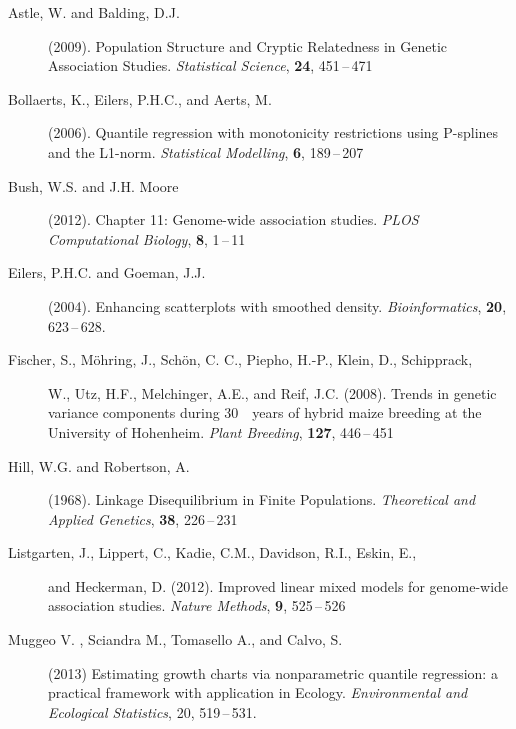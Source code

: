 \documentclass[twoside]{report}
\begin{document}




\begin{description}
\item[Astle, W. and Balding, D.J.] (2009).
		Population Structure and Cryptic Relatedness in Genetic Association Studies.
		{\it Statistical Science}, {\bf 24}, 451\,--\,471
\item[Bollaerts, K., Eilers, P.H.C., and Aerts, M.] (2006). 
	Quantile regression with monotonicity restrictions using P-splines and the L1-norm. 
	{\it Statistical Modelling}, {\bf 6}, 189\,--\,207 
\item[Bush, W.S. and J.H. Moore] (2012).
		Chapter 11: Genome-wide association studies.
		{\it PLOS Computational Biology}, {\bf 8}, 1\,--\,11
\item[Eilers, P.H.C. and Goeman, J.J.] (2004).
	Enhancing scatterplots with \newline smoothed density.
	{\it Bioinformatics}, {\bf 20}, 623\,--\,628.
\item[Fischer, S., M\"{o}hring, J., Sch\"{o}n, C. C., Piepho, H.-P., Klein, D., Schipprack,] W., {Utz, H.F., Melchinger, A.E., and Reif, J.C.} (2008).
		Trends in genetic variance components during 30 years of hybrid maize breeding at the University of Hohenheim.
		{\it Plant Breeding}, {\bf 127}, 446\,--\,451
\item[Hill, W.G. and Robertson, A.] (1968).
		Linkage Disequilibrium in Finite Populations.
		{\it Theoretical and Applied Genetics}, {\bf 38}, 226\,--\,231		
\item[Listgarten, J., Lippert, C., Kadie, C.M., Davidson, R.I., Eskin, E.,] and Heckerman, D. (2012). 
		Improved linear mixed models for genome-wide association studies.
		{\it Nature Methods}, {\bf 9}, 525\,--\,526
		
\item [Muggeo V. , Sciandra M., Tomasello A., and Calvo, S.] (2013) 
Estimating growth charts via 		
		nonparametric quantile regression: a practical framework with application in Ecology. 
		{\it Environmental and Ecological Statistics}, 20, 519\,--\,531. 		

\end{description}
\end{document}
